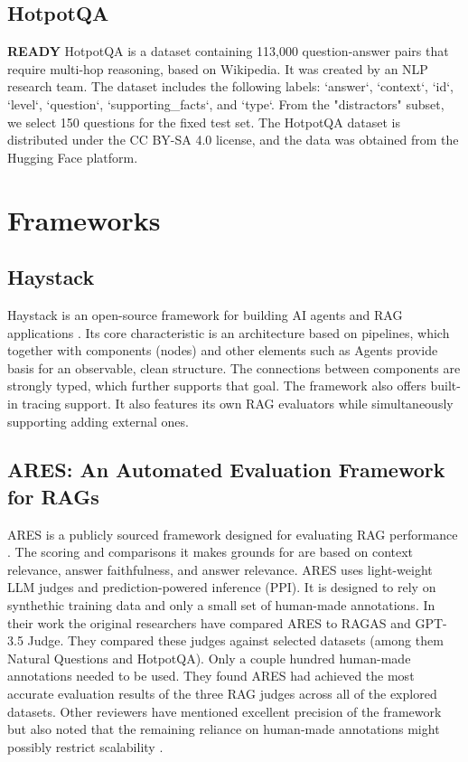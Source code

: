 \documentclass[11pt]{article}
\begin{document}
\subsection{HotpotQA}
\textbf{READY} HotpotQA is a dataset containing 113,000 question-answer pairs that require multi-hop reasoning, based on Wikipedia. It was created by an NLP research team. The dataset includes the following labels: `answer`, `context`, `id`, `level`, `question`, `supporting\_facts`, and `type`. From the "distractors" subset, we select 150 questions for the fixed test set. The HotpotQA dataset is distributed under the CC BY-SA 4.0 license, and the data was obtained from the Hugging Face platform.
\section{Frameworks}

\subsection{Haystack}
Haystack is an open-source framework for building AI agents and RAG applications \cite{haystackdocs}. Its core characteristic is an architecture based on pipelines, which together with components (nodes) and other elements such as Agents provide basis for an observable, clean structure. The connections between components are strongly typed, which further supports that goal. The framework also offers built-in tracing support. It also features its own RAG evaluators while simultaneously supporting adding external ones.

\subsection{ARES: An Automated Evaluation Framework for RAGs}
ARES is a publicly sourced framework designed for evaluating RAG performance \cite{ares}. The scoring and comparisons it makes grounds for are based on context relevance, answer faithfulness, and answer relevance. ARES uses light-weight LLM judges and prediction-powered inference (PPI). It is designed to rely on synthethic training data and only a small set of human-made annotations. In their work the original researchers have compared ARES to RAGAS and GPT-3.5 Judge. They compared these judges against selected datasets (among them Natural Questions and HotpotQA). Only a couple hundred human-made annotations needed to be used. They found ARES had achieved the most accurate evaluation results of the three RAG judges across all of the explored datasets. Other reviewers have mentioned excellent precision of the framework but also noted that the remaining reliance on human-made annotations might possibly restrict scalability \cite{brown2025}.
\end{document}
